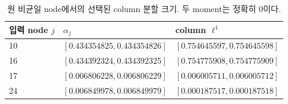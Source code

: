 \begin{table}[H]\centering\footnotesize
\caption{원 비균일 node에서의 선택된 column 분할 크기. 두 moment는 정확히 0이다.}
\label{tab:remap}
\setlength{\tabcolsep}{4pt}
\begin{tabular}{@{}lll@{}}\toprule
입력 node $j$ & $\alpha_j$ & column $\ell^1$\\\midrule
10 & $[0.434354825, 0.434354826]$ & $[0.754645597, 0.754645598]$\\
16 & $[0.434392324, 0.434392325]$ & $[0.754775908, 0.754775909]$\\
17 & $[0.006806228, 0.006806229]$ & $[0.006005711, 0.006005712]$\\
24 & $[0.006849978, 0.006849979]$ & $[0.000187517, 0.000187518]$\\
\bottomrule\end{tabular}
\end{table}

